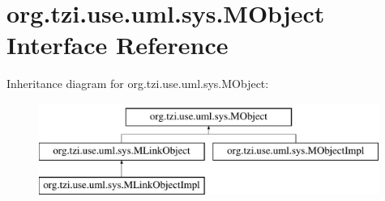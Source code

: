 \hypertarget{interfaceorg_1_1tzi_1_1use_1_1uml_1_1sys_1_1_m_object}{\section{org.\-tzi.\-use.\-uml.\-sys.\-M\-Object Interface Reference}
\label{interfaceorg_1_1tzi_1_1use_1_1uml_1_1sys_1_1_m_object}
}
Inheritance diagram for org.\-tzi.\-use.\-uml.\-sys.\-M\-Object\-:\begin{figure}[H]
\begin{center}
\leavevmode
\includegraphics[height=3.000000cm]{interfaceorg_1_1tzi_1_1use_1_1uml_1_1sys_1_1_m_object}
\end{center}
\end{figure}
